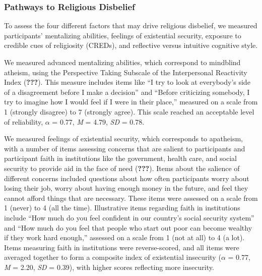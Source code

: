 \documentclass[english,man,mask]{article}
\begin{document}
\hypertarget{pathways-to-religious-disbelief}{%
\subsubsection{Pathways to Religious Disbelief}\label{pathways-to-religious-disbelief}}

To assess the four different factors that may drive religious disbelief, we measured participants' mentalizing abilities, feelings of existential security, exposure to credible cues of religiosity (CREDs), and reflective versus intuitive cognitive style.

We measured advanced mentalizing abilities, which correspond to mindblind atheism, using the Perspective Taking Subscale of the Interpersonal Reactivity Index ({\textbf{???}}). This measure includes items like \enquote{I try to look at everybody's side of a disagreement before I make a decision} and \enquote{Before criticizing somebody, I try to imagine how I would feel if I were in their place,} measured on a scale from 1 (strongly disagree) to 7 (strongly agree). This scale reached an acceptable level of reliability, \(\alpha\) = 0.77, \emph{M} = 4.79, \emph{SD} = 0.78.

We measured feelings of existential security, which corresponds to apatheism, with a number of items assessing concerns that are salient to participants and participant faith in institutions like the government, health care, and social security to provide aid in the face of need ({\textbf{???}}). Items about the salience of different concerns included questions about how often participants worry about losing their job, worry about having enough money in the future, and feel they cannot afford things that are necessary. These items were assessed on a scale from 1 (never) to 4 (all the time). Illustrative items regarding faith in institutions include \enquote{How much do you feel confident in our country's social security system} and \enquote{How much do you feel that people who start out poor can become wealthy if they work hard enough,} assessed on a scale from 1 (not at all) to 4 (a lot). Items measuring faith in institutions were reverse-scored, and all items were averaged together to form a composite index of existential insecurity (\(\alpha\) = 0.77, \emph{M} = 2.20, \emph{SD} = 0.39), with higher scores reflecting more insecurity.
\end{document}
